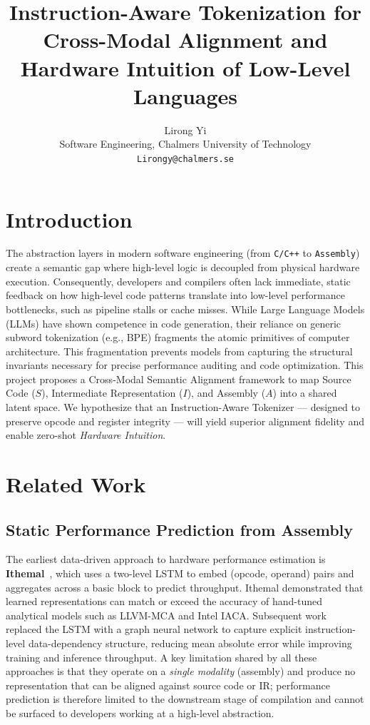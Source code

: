 \documentclass[11pt]{article}
\title{Instruction-Aware Tokenization for Cross-Modal Alignment and Hardware Intuition of Low-Level Languages}
\author{Lirong Yi \\
  Software Engineering, Chalmers University of Technology \\
  \texttt{Lirongy@chalmers.se}\\}
\begin{document}
\maketitle

\section{Introduction}

The abstraction layers in modern software engineering (from \texttt{C/C++} to \texttt{Assembly}) create a semantic gap where high-level logic is decoupled from physical hardware execution. Consequently, developers and compilers often lack immediate, static feedback on how high-level code patterns translate into low-level performance bottlenecks, such as pipeline stalls or cache misses. While Large Language Models (LLMs) have shown competence in code generation, their reliance on generic subword tokenization (e.g., BPE) fragments the atomic primitives of computer architecture. This fragmentation prevents models from capturing the structural invariants necessary for precise performance auditing and code optimization. This project proposes a Cross-Modal Semantic Alignment framework to map Source Code ($S$), Intermediate Representation ($I$), and Assembly ($A$) into a shared latent space. We hypothesize that an Instruction-Aware Tokenizer --- designed to preserve opcode and register integrity --- will yield superior alignment fidelity and enable zero-shot \emph{Hardware Intuition}.

\section{Related Work}

\subsection{Static Performance Prediction from Assembly}

The earliest data-driven approach to hardware performance estimation is \textbf{Ithemal}~\cite{mendis2019ithemal}, which uses a two-level LSTM to embed (opcode, operand) pairs and aggregates across a basic block to predict throughput. Ithemal demonstrated that learned representations can match or exceed the accuracy of hand-tuned analytical models such as LLVM-MCA and Intel IACA. Subsequent work replaced the LSTM with a graph neural network to capture explicit instruction-level data-dependency structure, reducing mean absolute error while improving training and inference throughput. A key limitation shared by all these approaches is that they operate on a \emph{single modality} (assembly) and produce no representation that can be aligned against source code or IR; performance prediction is therefore limited to the downstream stage of compilation and cannot be surfaced to developers working at a high-level abstraction.
\end{document}
